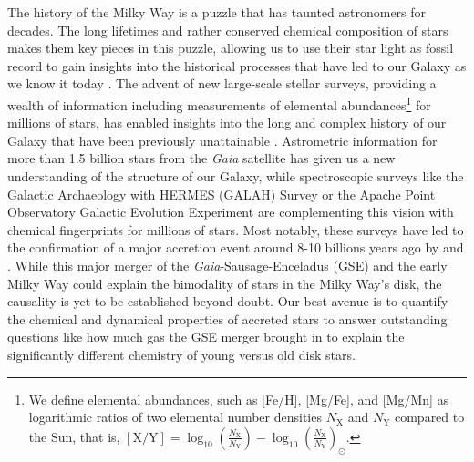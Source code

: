 \documentclass[fleqn,usenatbib]{mnras}
\newcommand{\Gaia}{\textit{Gaia}\xspace} %
\begin{document}
The history of the Milky Way is a puzzle that has taunted astronomers for decades. The long lifetimes and rather conserved chemical composition of stars makes them key pieces in this puzzle, allowing us to use their star light as fossil record to gain insights into the historical processes that have led to our Galaxy as we know it today \citep{FreemanBlandHawthorn2002}. The advent of new large-scale stellar surveys, providing a wealth of information including measurements of elemental abundances\footnote{We define elemental abundances, such as [Fe/H], [Mg/Fe], and [Mg/Mn] as logarithmic ratios of two elemental number densities $N_\mathrm{X}$ and $N_\mathrm{Y}$ compared to the Sun, that is, $\left[\text{X/Y}\right]=\log_{10}\left(\frac{N_\mathrm{X}}{N_\mathrm{Y}}\right) -\log_{10}\left(\frac{N_\mathrm{X}}{N_\mathrm{Y}}\right)_\odot$.} for millions of stars, has enabled insights into the long and complex history of our Galaxy that have been previously unattainable \citep{Jofre2019}. Astrometric information for more than 1.5 billion stars from the \Gaia satellite \citep{Brown2016,Brown2018,Brown2021} has given us a new understanding of the structure of our Galaxy, while spectroscopic surveys like the Galactic Archaeology with HERMES (GALAH) Survey \citep{daSilva2015} or the Apache Point Observatory Galactic Evolution Experiment \citep[APOGEE,][]{Majewski2016} are complementing this vision with chemical fingerprints for millions of stars. Most notably, these surveys have led to the confirmation of a major accretion event around 8-10 billions years ago by \citet{Belokurov2018} and \citet{Helmi2018}. While this major merger of the \Gaia-Sausage-Enceladus (GSE) and the early Milky Way could explain the bimodality of stars in the Milky Way's disk, the causality is yet to be established beyond doubt. Our best avenue is to quantify the chemical and dynamical properties of accreted stars to answer outstanding questions like how much gas the GSE merger brought in to explain the significantly different chemistry of young versus old disk stars.
\end{document}

